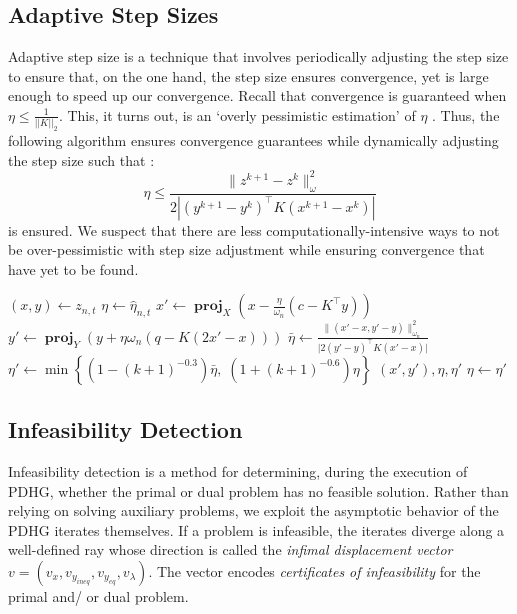 \documentclass[twoside,12pt,openright]{report}  %
\DeclareMathOperator*{\proj}{\textbf{proj}}
\begin{document}

\subsection{Adaptive Step Sizes}\label{math_step_size}
Adaptive step size is a technique that involves periodically adjusting the step size to ensure that, on the one hand, the step size ensures convergence, yet is large enough to speed up our convergence. Recall that convergence is guaranteed when $\eta \leq \frac{1}{||K||_2}$. This, it turns out, is an `overly pessimistic estimation' of $\eta$ \cite{applegate2}. Thus, the following algorithm ensures convergence guarantees while dynamically adjusting the step size such that :
\begin{equation}
\eta \leq \frac{\|z^{k+1}-z^{k}\|^2_{\omega}}{2|(y^{k+1}-y^k)^\top K(x^{k+1}-x^k)|}
\end{equation}
is ensured. We suspect that there are less computationally-intensive ways to not be over-pessimistic with step size adjustment while ensuring convergence that have yet to be found.
\begin{algorithm}[H]
\begin{algorithmic}[1]
\caption{AdaptiveStepOfPDHG ($z_{n,t}, \omega_n, \hat{\eta}_{n,t}, k$)\cite{applegate2}:}
\label{alg:adaptive_step}
        \State $(x, y) \leftarrow z_{n,t}$
        \State $\eta \leftarrow \hat{\eta}_{n,t}$
            \State $x' \leftarrow \proj_{X}\left( x - \frac{\eta}{\omega_n}(c - K^\top y) \right)$
            \State $y' \leftarrow \proj_{Y}\left( y + \eta \omega_n (q - K (2x' - x)) \right)$
            \State $\bar{\eta} \leftarrow \frac{\|(x' - x, y' - y)\|_{\omega_n}^2}{\lvert2(y' - y)^\top K (x' - x)\rvert}$
            \State $\eta' \leftarrow \min\left\{ (1 - (k + 1)^{-0.3})\bar{\eta},\; (1 + (k + 1)^{-0.6})\eta \right\}$
            \If{$\eta \leq \bar{\eta}$}
                \State \Return $(x', y'), \eta, \eta'$
            \EndIf
            \State $\eta \leftarrow \eta'$
        \EndWhile
\end{algorithmic}
\end{algorithm}

\subsection{Infeasibility Detection}\label{sec:infeas_detect}
Infeasibility detection is a method for determining, during the execution of PDHG, whether the primal or dual problem has no feasible solution. Rather than relying on solving auxiliary problems, we exploit the asymptotic behavior of the PDHG iterates themselves. If a problem is infeasible, the iterates diverge along a well-defined ray whose direction is called the \emph{infimal displacement vector} \(v=(v_x,v_{y_{ineq}},v_{y_{eq}},v_{\lambda})\). The vector encodes \emph{certificates of infeasibility} for the primal and/ or dual problem.
\end{document}
